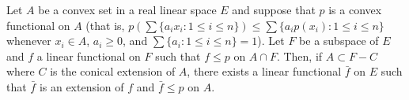 Let $A$ be a convex set in a real linear space $E$ and suppose that $p$ is a convex functional on $A$ (that is, $p\!\left(\sum \{a_i x_i : 1 \leq i \leq n\}\right) \leq \sum \{a_i p(x_i) : 1 \leq i \leq n\}$ whenever $x_i \in A$, $a_i \geq 0$, and $\sum \{a_i : 1 \leq i \leq n\} = 1$). Let $F$ be a subspace of $E$ and $f$ a linear functional on $F$ such that $f \leq p$ on $A \cap F$. Then, if $A \subset F - C$ where $C$ is the conical extension of $A$, there exists a linear functional $\bar{f}$ on $E$ such that $\bar{f}$ is an extension of $f$ and $\bar{f} \leq p$ on $A$.
